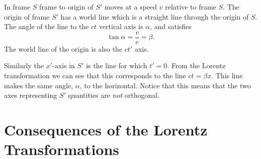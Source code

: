 \documentclass[fleqn]{NotesClass}
\begin{document}
    In frame \(S\) frame to origin of \(S'\) moves at a speed \(v\) relative to frame \(S\).
    The origin of frame \(S'\) has a world line which is a straight line through the origin of \(S\).
    The angle of the line to the \(ct\) vertical axis is \(\alpha\), and satisfies
    \begin{equation}\label{eqn:tan alpha = beta}
        \tan \alpha = \frac{v}{c} = \beta.
    \end{equation}
    The world line of the origin is also the \(ct'\) axis.
    
    Similarly the \(x'\)-axis in \(S'\) is the line for which \(t' = 0\).
    From the Lorentz transformation we can see that this corresponds to the line \(ct = \beta x\).
    This line makes the same angle, \(\alpha\), to the horizontal.
    Notice that this means that the two axes representing \(S'\) quantities are \emph{not} orthogonal.
    
    \section{Consequences of the Lorentz Transformations}
\end{document}

